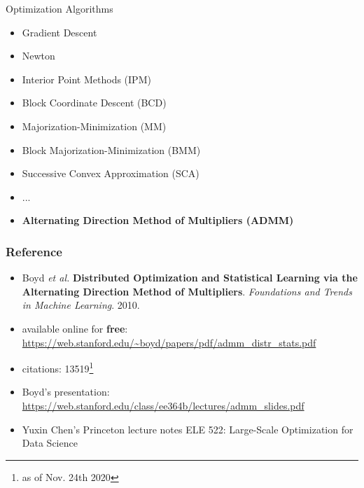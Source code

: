 \documentclass[aspectratio=169]{beamer}
\begin{document}
        \begin{frame}{Optimization Algorithms}
          \begin{itemize}
            \item Gradient Descent
            \item Newton
            \item Interior Point Methods (IPM)
            \item Block Coordinate Descent (BCD)
            \item Majorization-Minimization (MM)
            \item Block Majorization-Minimization (BMM)
            \item Successive Convex Approximation (SCA)
            \pause
            \item ...
            \pause
            \item \bf{Alternating Direction Method of Multipliers (ADMM)}
          \end{itemize}
        \end{frame}
  \begin{frame}
    \frametitle{Reference}
          \begin{itemize}
            \item Boyd \textit{et al.} \textbf{Distributed Optimization and Statistical Learning via the Alternating Direction Method of Multipliers}.
              \textit{Foundations and Trends in Machine Learning}. 2010.
            \item available online for \textbf{free}: \url{https://web.stanford.edu/\~boyd/papers/pdf/admm\_distr\_stats.pdf}
            \item citations: 13519\footnote{as of Nov. 24th 2020}
            \item Boyd's presentation: \url{https://web.stanford.edu/class/ee364b/lectures/admm\_slides.pdf}
            \item Yuxin Chen's Princeton lecture notes ELE 522: Large-Scale Optimization for Data Science
          \end{itemize}
  \end{frame}
\end{document}
